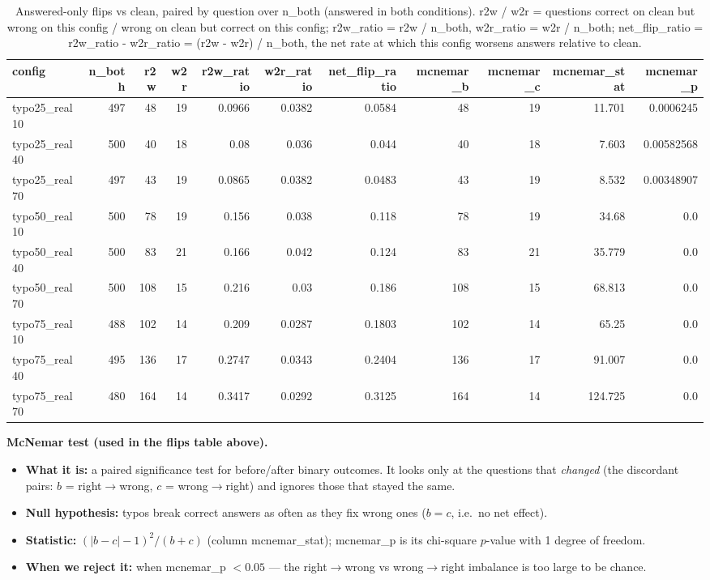\documentclass[11pt]{article}
\begin{document}
\begin{table}[H]
\centering
\caption{Answered-only flips vs clean, paired by question over n\_both (answered in both conditions). r2w / w2r = questions correct on clean but wrong on this config / wrong on clean but correct on this config; r2w\_ratio = r2w / n\_both, w2r\_ratio = w2r / n\_both; net\_flip\_ratio = r2w\_ratio - w2r\_ratio = (r2w - w2r) / n\_both, the net rate at which this config worsens answers relative to clean.}
\small
\begin{adjustbox}{max width=\textwidth}
\begin{tabular}{lrrrrrrrrrr}
\toprule
\textbf{config} & \textbf{n\_both} & \textbf{r2w} & \textbf{w2r} & \textbf{r2w\_ratio} & \textbf{w2r\_ratio} & \textbf{net\_flip\_ratio} & \textbf{mcnemar\_b} & \textbf{mcnemar\_c} & \textbf{mcnemar\_stat} & \textbf{mcnemar\_p} \\
\midrule
typo25\_real10 & 497 & 48 & 19 & 0.0966 & 0.0382 & 0.0584 & 48 & 19 & 11.701 & 0.0006245 \\
typo25\_real40 & 500 & 40 & 18 & 0.08 & 0.036 & 0.044 & 40 & 18 & 7.603 & 0.00582568 \\
typo25\_real70 & 497 & 43 & 19 & 0.0865 & 0.0382 & 0.0483 & 43 & 19 & 8.532 & 0.00348907 \\
typo50\_real10 & 500 & 78 & 19 & 0.156 & 0.038 & 0.118 & 78 & 19 & 34.68 & 0.0 \\
typo50\_real40 & 500 & 83 & 21 & 0.166 & 0.042 & 0.124 & 83 & 21 & 35.779 & 0.0 \\
typo50\_real70 & 500 & 108 & 15 & 0.216 & 0.03 & 0.186 & 108 & 15 & 68.813 & 0.0 \\
typo75\_real10 & 488 & 102 & 14 & 0.209 & 0.0287 & 0.1803 & 102 & 14 & 65.25 & 0.0 \\
typo75\_real40 & 495 & 136 & 17 & 0.2747 & 0.0343 & 0.2404 & 136 & 17 & 91.007 & 0.0 \\
typo75\_real70 & 480 & 164 & 14 & 0.3417 & 0.0292 & 0.3125 & 164 & 14 & 124.725 & 0.0 \\
\bottomrule
\end{tabular}
\end{adjustbox}
\end{table}

\medskip
\noindent\textbf{McNemar test (used in the flips table above).}
\begin{itemize}\setlength{\itemsep}{1pt}
  \item \textbf{What it is:} a paired significance test for before/after binary
  outcomes. It looks only at the questions that \emph{changed} (the discordant pairs:
  $b$ = right$\to$wrong, $c$ = wrong$\to$right) and ignores those that stayed the same.
  \item \textbf{Null hypothesis:} typos break correct answers as often as they fix
  wrong ones ($b = c$, i.e.\ no net effect).
  \item \textbf{Statistic:} $(|b - c| - 1)^2 / (b + c)$ (column mcnemar\_stat);
  mcnemar\_p is its chi-square $p$-value with 1 degree of freedom.
  \item \textbf{When we reject it:} when mcnemar\_p $< 0.05$ --- the
  right$\to$wrong vs wrong$\to$right imbalance is too large to be chance.
\end{itemize}
\end{document}
